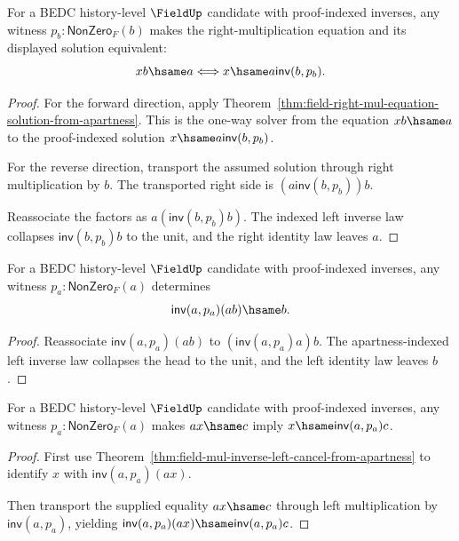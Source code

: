 \begin{theorem}
\label{thm:field-right-mul-equation-exact-from-apartness}
For a BEDC history-level $\FieldUp$ candidate with proof-indexed inverses,
any witness $p_b:\mathsf{NonZero}_F(b)$ makes the right-multiplication
equation and its displayed solution equivalent:
$$
x b\hsame a
\Longleftrightarrow
x\hsame a\mathsf{inv}(b,p_b).
$$
\end{theorem}
\begin{proof}
For the forward direction, apply
Theorem~\ref{thm:field-right-mul-equation-solution-from-apartness}. This is
the one-way solver from the equation $x b\hsame a$ to the proof-indexed
solution $x\hsame a\mathsf{inv}(b,p_b)$.

For the reverse direction, transport the assumed solution through right
multiplication by $b$. The transported right side is
$(a\mathsf{inv}(b,p_b))b$.

Reassociate the factors as $a(\mathsf{inv}(b,p_b)b)$. The indexed left
inverse law collapses $\mathsf{inv}(b,p_b)b$ to the unit, and the right
identity law leaves $a$.
\end{proof}

\begin{theorem}
\label{thm:field-mul-inverse-left-cancel-from-apartness}
For a BEDC history-level $\FieldUp$ candidate with proof-indexed inverses,
any witness $p_a:\mathsf{NonZero}_F(a)$ determines
$$
\mathsf{inv}(a,p_a)(a b)\hsame b.
$$
\end{theorem}
\begin{proof}
Reassociate $\mathsf{inv}(a,p_a)(a b)$ to
$(\mathsf{inv}(a,p_a)a)b$. The apartness-indexed left inverse law collapses
the head to the unit, and the left identity law leaves $b$.
\end{proof}

\begin{theorem}
\label{thm:field-left-mul-equation-solution-from-apartness}
For a BEDC history-level $\FieldUp$ candidate with proof-indexed inverses,
any witness $p_a:\mathsf{NonZero}_F(a)$ makes $a x\hsame c$ imply
$x\hsame \mathsf{inv}(a,p_a)c$.
\end{theorem}
\begin{proof}
First use Theorem~\ref{thm:field-mul-inverse-left-cancel-from-apartness}
to identify $x$ with $\mathsf{inv}(a,p_a)(a x)$.

Then transport the supplied equality $a x\hsame c$ through left multiplication
by $\mathsf{inv}(a,p_a)$, yielding
$\mathsf{inv}(a,p_a)(a x)\hsame \mathsf{inv}(a,p_a)c$.
\end{proof}

